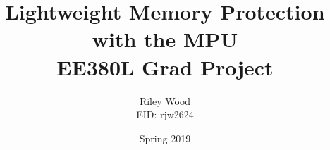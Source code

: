 \documentclass[]{report}
\begin{document}
\title{Lightweight Memory Protection with the MPU \\
    \large EE380L Grad Project}
\author{Riley Wood\\EID: rjw2624}
\date{Spring 2019}
\maketitle













% 
% 
\end{document}
